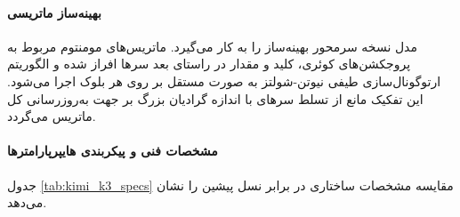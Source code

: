 \paragraph*{بهینه‌ساز ماتریسی }
مدل  نسخه سر‌محور بهینه‌ساز  \cite{jordan2024muon} را به کار می‌گیرد. ماتریس‌های مومنتوم مربوط به پروجکشن‌های کوئری، کلید و مقدار در راستای بعد سرها افراز شده و الگوریتم ارتوگونال‌سازی طیفی نیوتن-شولتز به صورت مستقل بر روی هر بلوک اجرا می‌شود. این تفکیک مانع از تسلط سرهای با اندازه گرادیان بزرگ بر جهت به‌روزرسانی کل ماتریس می‌گردد.

\paragraph*{مشخصات فنی و پیکربندی هایپرپارامترها}
جدول \ref{tab:kimi_k3_specs} مقایسه مشخصات ساختاری  در برابر نسل پیشین  را نشان می‌دهد.

